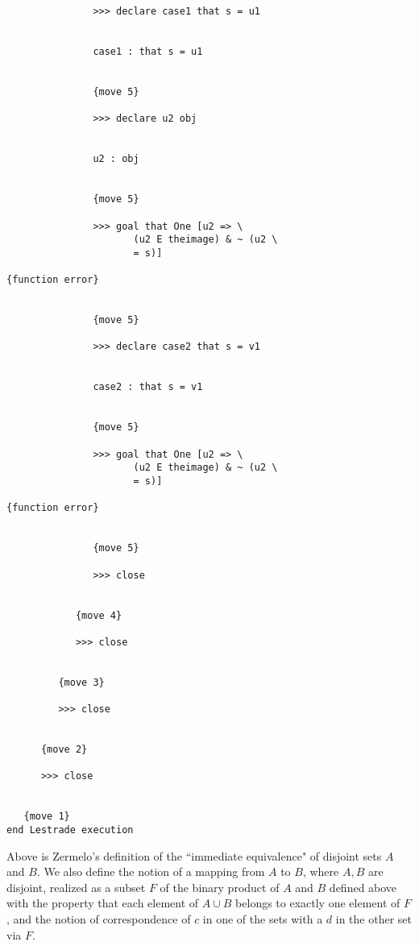 \documentclass[12pt]{article}
\begin{document}
\begin{verbatim}
               >>> declare case1 that s = u1


               case1 : that s = u1


               {move 5}

               >>> declare u2 obj


               u2 : obj


               {move 5}

               >>> goal that One [u2 => \
                      (u2 E theimage) & ~ (u2 \
                      = s)]

{function error}


               {move 5}

               >>> declare case2 that s = v1


               case2 : that s = v1


               {move 5}

               >>> goal that One [u2 => \
                      (u2 E theimage) & ~ (u2 \
                      = s)]

{function error}


               {move 5}

               >>> close


            {move 4}

            >>> close


         {move 3}

         >>> close


      {move 2}

      >>> close


   {move 1}
end Lestrade execution
\end{verbatim}

Above is Zermelo's definition of the ``immediate equivalence" of disjoint sets $A$ and $B$.  We also define the notion of a mapping from $A$ to $B$, where $A,B$ are disjoint, 
realized as a subset $F$ of the binary product of $A$ and $B$ defined above with the property that each element of $A \cup B$ belongs to exactly one element of $F$, and the notion of correspondence of $c$ in one of the sets with a $d$ in the other set via $F$.
\end{document}
